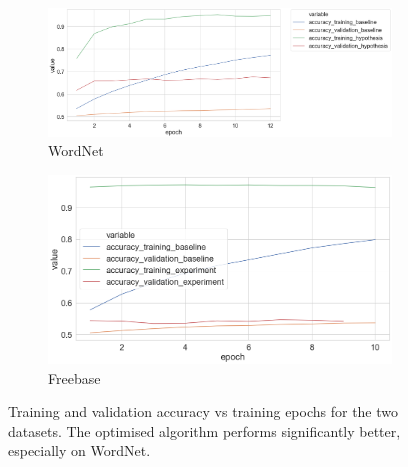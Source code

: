 \begin{figure}[H]
	\begin{subfigure}[b]{.5\linewidth}
   		\centering
    		\includegraphics[width=1.0\linewidth, height=0.6\linewidth]{Wordnet_Accuracy_Results_Early_Stopping}
		\captionsetup{justification=centering}
		\caption{WordNet}
	\end{subfigure}
	\begin{subfigure}[b]{.5\linewidth}
   		\centering
		\includegraphics[width=1.0\linewidth, height=0.6\linewidth]{Freebase_Accuracy_Results}
		\captionsetup{justification=centering}
		\caption{Freebase}
	\end{subfigure}
	\caption{Training and validation accuracy vs training epochs for the two datasets. The optimised algorithm performs significantly better, especially on WordNet.}
\end{figure}

